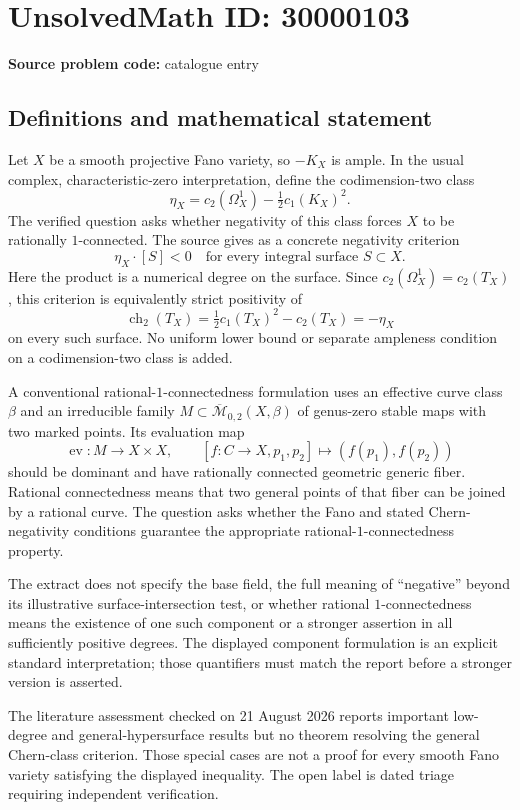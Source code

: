 \documentclass[11pt]{article}
\begin{document}
\section*{UnsolvedMath ID: 30000103}
\textbf{Source problem code:} catalogue entry
\subsection{Definitions and mathematical statement}
Let $X$ be a smooth projective Fano variety, so $-K_X$ is ample. In the usual complex, characteristic-zero interpretation, define the codimension-two class
\[
 \eta_X=c_2(\Omega_X^1)-\tfrac12c_1(K_X)^2.
\]
The verified question asks whether negativity of this class forces $X$ to be rationally $1$-connected. The source gives as a concrete negativity criterion
\[
 \eta_X\cdot[S]<0\quad\text{for every integral surface }S\subset X.
\]
Here the product is a numerical degree on the surface. Since $c_2(\Omega_X^1)=c_2(T_X)$, this criterion is equivalently strict positivity of
\[
 \operatorname{ch}_2(T_X)=\tfrac12c_1(T_X)^2-c_2(T_X)=-\eta_X
\]
on every such surface. No uniform lower bound or separate ampleness condition on a codimension-two class is added.

A conventional rational-$1$-connectedness formulation uses an effective curve class $\beta$ and an irreducible family $M\subset\overline{\mathcal M}_{0,2}(X,\beta)$ of genus-zero stable maps with two marked points. Its evaluation map
\[
 \operatorname{ev}:M\longrightarrow X\times X,\qquad
 [f:C\to X,p_1,p_2]\longmapsto(f(p_1),f(p_2))
\]
should be dominant and have rationally connected geometric generic fiber. Rational connectedness means that two general points of that fiber can be joined by a rational curve. The question asks whether the Fano and stated Chern-negativity conditions guarantee the appropriate rational-$1$-connectedness property.

The extract does not specify the base field, the full meaning of ``negative'' beyond its illustrative surface-intersection test, or whether rational $1$-connectedness means the existence of one such component or a stronger assertion in all sufficiently positive degrees. The displayed component formulation is an explicit standard interpretation; those quantifiers must match the report before a stronger version is asserted.

The literature assessment checked on 21 August 2026 reports important low-degree and general-hypersurface results but no theorem resolving the general Chern-class criterion. Those special cases are not a proof for every smooth Fano variety satisfying the displayed inequality. The open label is dated triage requiring independent verification.
\end{document}

